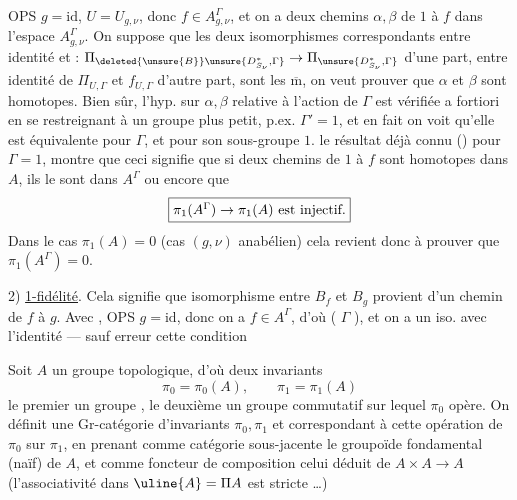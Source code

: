OPS \(g=\mathrm{id}\), \(U=U_{g,\nu}\), donc \(f\in A_{g,\nu}^{\Gamma}\), et on a deux chemins \(\alpha,\beta\) de \(1\) à  \(f\) dans l'espace \(A_{g,\nu}^{\Gamma}\). On suppose que les deux isomorphismes correspondants entre identité  et  : \(\Pi_{\deleted{\unsure{B}}\unsure{D^*_{S_\nu},\Gamma}}\to\Pi_{\unsure{D^*_{S_\nu},\Gamma}}\) d'une part, entre identité de \(\Pi_{U,\Gamma}\) et \(f_{U,\Gamma}\) d'autre part, sont les \(\overline{\mathrm m}\), on veut prouver que \(\alpha\) et \(\beta\) sont homotopes. Bien sûr, l'hyp.  sur \(\alpha,\beta\) relative à l'action de \(\Gamma\) est vérifiée a fortiori en se restreignant à un groupe plus petit, p.ex. \deleted{\unsure{\(\Gamma\)}} \(\Gamma'=1\), et en fait on voit qu'elle est équivalente pour \(\Gamma\), et pour son sous-groupe \(1\).  le résultat déjà connu () pour \(\Gamma=1\), montre que ceci signifie que si deux chemins  de \(1\) à \(f\) sont homotopes dans \(A\), ils le sont dans \(A^{\Gamma}\) ou encore que
\[
\fbox{\(\pi_1(A^{\Gamma})\to\pi_1(A)\ \mbox{est injectif.}\)}
\]
Dans le cas \(\pi_1(A)=0\) (cas \((g,\nu)\) anabélien) cela revient donc à prouver que \(\pi_1(A^{\Gamma})=0\).



2) \uline{1-fidélité}. Cela signifie  que \unsure{\(\forall\)} isomorphisme entre  \(B_f\) et \(B_g\) provient d'un  chemin de \(f\) à \(g\). Avec , OPS \(g=\mathrm{id}\), donc on a \(f\in A^{\Gamma}\), d'où  (  \(\Gamma\) ), et on a un iso. avec l'identité --- sauf erreur cette condition



Soit \(A\) un groupe topologique, d'où deux invariants
\[
\pi_0=\pi_0(A),\qquad \pi_1=\pi_1(A)
\]
le premier un groupe ,  le deuxième un groupe commutatif sur lequel \(\pi_0\) opère. On définit une Gr-catégorie  d'invariants \(\pi_0,\pi_1\) et correspondant à cette opération de \(\pi_0\) sur \(\pi_1\), en prenant comme catégorie sous-jacente le  groupoïde  fondamental (naïf) de \(A\), et comme foncteur de composition celui déduit de \(A\times A\to A\) (l'associativité dans \(\uline{A}=\Pi A\) est stricte \ldots)

